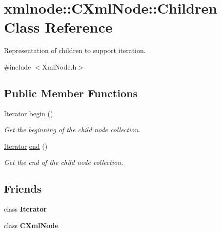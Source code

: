 \hypertarget{classxmlnode_1_1_c_xml_node_1_1_children}{\section{xmlnode\+:\+:C\+Xml\+Node\+:\+:Children Class Reference}
\label{classxmlnode_1_1_c_xml_node_1_1_children}
}


Representation of children to support iteration.  




{\ttfamily \#include $<$Xml\+Node.\+h$>$}

\subsection*{Public Member Functions}
\begin{DoxyCompactItemize}
\item 
\hyperlink{classxmlnode_1_1_c_xml_node_1_1_iterator}{Iterator} \hyperlink{classxmlnode_1_1_c_xml_node_1_1_children_a8f0cac16fdda64bbf10cb08eba606dd1}{begin} ()
\begin{DoxyCompactList}\small\item\em Get the beginning of the child node collection. \end{DoxyCompactList}\item 
\hyperlink{classxmlnode_1_1_c_xml_node_1_1_iterator}{Iterator} \hyperlink{classxmlnode_1_1_c_xml_node_1_1_children_a3fe6fb9e62c63d6a9ea46653608d42e8}{end} ()
\begin{DoxyCompactList}\small\item\em Get the end of the child node collection. \end{DoxyCompactList}\end{DoxyCompactItemize}
\subsection*{Friends}
\begin{DoxyCompactItemize}
\item 
\hypertarget{classxmlnode_1_1_c_xml_node_1_1_children_a9830fc407400559db7e7783cc10a9394}{class {\bfseries Iterator}}\label{classxmlnode_1_1_c_xml_node_1_1_children_a9830fc407400559db7e7783cc10a9394}

\item 
\hypertarget{classxmlnode_1_1_c_xml_node_1_1_children_a770307dc9d4e2e7005bcf200bae3066a}{class {\bfseries C\+Xml\+Node}}\label{classxmlnode_1_1_c_xml_node_1_1_children_a770307dc9d4e2e7005bcf200bae3066a}

\end{DoxyCompactItemize}


